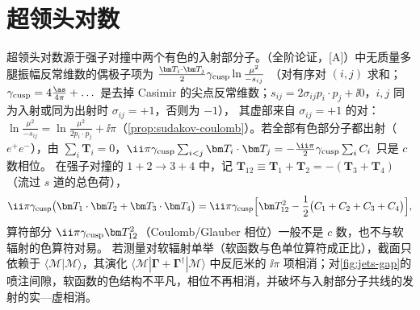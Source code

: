 \section{超领头对数}\label{sec:jets-sll}

超领头对数源于强子对撞中两个有色的入射部分子。（全阶论证，[A]）中无质量多腿振幅反常维数的偶极子项为 $\frac{\bm T_i\cdot\bm T_j}{2}\gamma_{\rm cusp}\ln\frac{\mu^2}{-s_{ij}}$
（对有序对 $(i,j)$ 求和；$\gamma_{\rm cusp}=4\frac{\as}{4\pi}+\dots$ 是去掉 Casimir 的尖点反常维数；$s_{ij}=2\sigma_{ij}p_i\cdot p_j+\ii0$，$i,j$ 同为入射或同为出射时 $\sigma_{ij}=+1$，否则为 $-1$），
其虚部来自 $\sigma_{ij}=+1$ 的对：$\ln\frac{\mu^2}{-s_{ij}}=\ln\frac{\mu^2}{2p_i\cdot p_j}+\ii\pi$（\cref{prop:sudakov-coulomb}）。若全部有色部分子都出射（$e^+e^-$），由 $\sum_i\bm T_i=0$，$\ii\pi\gamma_{\rm cusp}\sum_{i<j}\bm T_i\cdot\bm T_j=-\frac{\ii\pi}{2}\gamma_{\rm cusp}\sum_iC_i$ 只是 $c$ 数相位。
在强子对撞的 $1+2\to3+4$ 中，记 $\bm T_{12}\equiv\bm T_1+\bm T_2=-(\bm T_3+\bm T_4)$（流过 $s$ 道的总色荷），
\begin{equation}\label{eq:jets-coulomb-pp}
\ii\pi\gamma_{\rm cusp}\big(\bm T_1\cdot\bm T_2+\bm T_3\cdot\bm T_4\big)=\ii\pi\gamma_{\rm cusp}\Big[\bm T_{12}^2-\frac12\big(C_1+C_2+C_3+C_4\big)\Big],
\end{equation}
算符部分 $\ii\pi\gamma_{\rm cusp}\bm T_{12}^2$（Coulomb/Glauber 相位）一般不是 $c$ 数，也不与软辐射的色算符对易。
若测量对软辐射单举（软函数与色单位算符成正比），截面只依赖于 $\langle\mathcal M|\mathcal M\rangle$，其演化 $\langle\mathcal M|\bm\Gamma+\bm\Gamma^\dagger|\mathcal M\rangle$ 中反厄米的 $\ii\pi$ 项相消；对\cref{fig:jets-gap}的喷注间隙，软函数的色结构不平凡，相位不再相消，并破坏与入射部分子共线的发射的实—虚相消。

